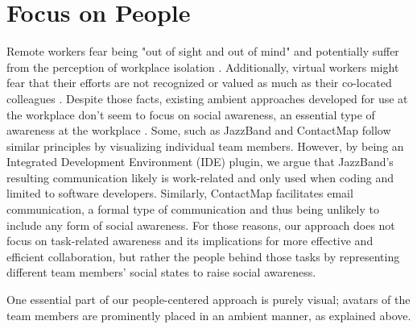 \section{Focus on People}
Remote workers fear being "out of sight and out of mind" \autocite{bailey1999advantages} and potentially suffer from the perception of workplace isolation \autocite{mulki2009set, marshall2007workplace}. Additionally, virtual workers might fear that their efforts are not recognized or valued as much as their co-located colleagues \autocite{cooper2002telecommuting}. Despite those facts, existing ambient approaches developed for use at the workplace don't seem to focus on social awareness, an essential type of awareness at the workplace \autocite{greenberg1996awareness}. Some, such as JazzBand and ContactMap \autocite{cheng2003jazzing, whittaker2004contactmap} follow similar principles by visualizing individual team members. However, by being an Integrated Development Environment (IDE) plugin, we argue that JazzBand's resulting communication likely is work-related and only used when coding and limited to software developers. Similarly, ContactMap facilitates email communication, a formal type of communication and thus being unlikely to include any form of social awareness. For those reasons, our approach does not focus on task-related awareness and its implications for more effective and efficient collaboration, but rather the people behind those tasks by representing different team members' social states to raise social awareness.

One essential part of our people-centered approach is purely visual; avatars of the team members are prominently placed in an ambient manner, as explained above.

